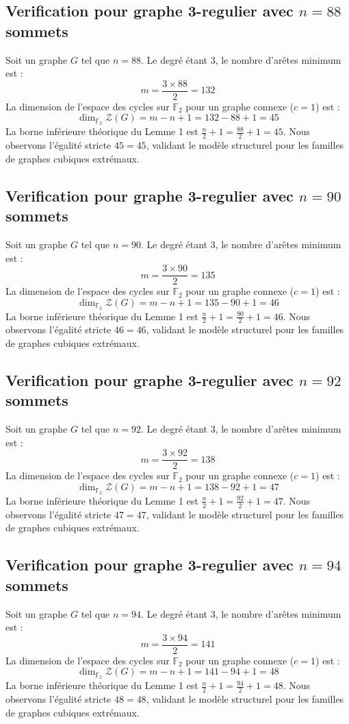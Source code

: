 \documentclass[11pt,a4paper]{article}
\begin{document}
\subsection{Verification pour graphe 3-regulier avec $n=88$ sommets}
Soit un graphe $G$ tel que $n = 88$. Le degré étant 3, le nombre d'arêtes minimum est :
$$ m = \frac{3 \times 88}{2} = 132 $$
La dimension de l'espace des cycles sur $\mathbb{F}_2$ pour un graphe connexe ($c=1$) est :
$$ \dim_{\mathbb{F}_2} \mathcal{Z}(G) = m - n + 1 = 132 - 88 + 1 = 45 $$
La borne inférieure théorique du Lemme 1 est $\frac{n}{2} + 1 = \frac{88}{2} + 1 = 45$.
Nous observons l'égalité stricte $45 = 45$, validant le modèle structurel pour les familles de graphes cubiques extrémaux.

\subsection{Verification pour graphe 3-regulier avec $n=90$ sommets}
Soit un graphe $G$ tel que $n = 90$. Le degré étant 3, le nombre d'arêtes minimum est :
$$ m = \frac{3 \times 90}{2} = 135 $$
La dimension de l'espace des cycles sur $\mathbb{F}_2$ pour un graphe connexe ($c=1$) est :
$$ \dim_{\mathbb{F}_2} \mathcal{Z}(G) = m - n + 1 = 135 - 90 + 1 = 46 $$
La borne inférieure théorique du Lemme 1 est $\frac{n}{2} + 1 = \frac{90}{2} + 1 = 46$.
Nous observons l'égalité stricte $46 = 46$, validant le modèle structurel pour les familles de graphes cubiques extrémaux.

\subsection{Verification pour graphe 3-regulier avec $n=92$ sommets}
Soit un graphe $G$ tel que $n = 92$. Le degré étant 3, le nombre d'arêtes minimum est :
$$ m = \frac{3 \times 92}{2} = 138 $$
La dimension de l'espace des cycles sur $\mathbb{F}_2$ pour un graphe connexe ($c=1$) est :
$$ \dim_{\mathbb{F}_2} \mathcal{Z}(G) = m - n + 1 = 138 - 92 + 1 = 47 $$
La borne inférieure théorique du Lemme 1 est $\frac{n}{2} + 1 = \frac{92}{2} + 1 = 47$.
Nous observons l'égalité stricte $47 = 47$, validant le modèle structurel pour les familles de graphes cubiques extrémaux.

\subsection{Verification pour graphe 3-regulier avec $n=94$ sommets}
Soit un graphe $G$ tel que $n = 94$. Le degré étant 3, le nombre d'arêtes minimum est :
$$ m = \frac{3 \times 94}{2} = 141 $$
La dimension de l'espace des cycles sur $\mathbb{F}_2$ pour un graphe connexe ($c=1$) est :
$$ \dim_{\mathbb{F}_2} \mathcal{Z}(G) = m - n + 1 = 141 - 94 + 1 = 48 $$
La borne inférieure théorique du Lemme 1 est $\frac{n}{2} + 1 = \frac{94}{2} + 1 = 48$.
Nous observons l'égalité stricte $48 = 48$, validant le modèle structurel pour les familles de graphes cubiques extrémaux.
\end{document}
